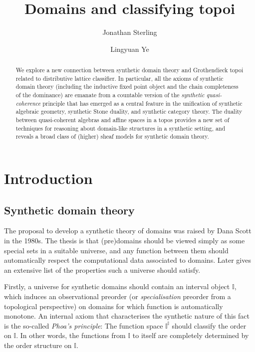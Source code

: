 \documentclass[a4paper,12pt]{amsart}
\title{Domains and classifying topoi}
\author{Jonathan Sterling}
\author{Lingyuan Ye}
\theoremstyle{definition}
\newcommand{\mbb}[1]{\mathbb{#1}}
\newcommand{\I}{\mbb I}
\begin{document}
\begin{abstract}
  We explore a new connection between synthetic domain theory and Grothendieck topoi related to distributive lattice classifier. In particular, all the axioms of synthetic domain theory (including the inductive fixed point object and the chain completeness of the dominance) are emanate from a countable version of the \emph{synthetic quasi-coherence} principle that has emerged as a central feature in the unification of synthetic algebraic geometry, synthetic Stone duality, and synthetic category theory. The duality between quasi-coherent algebras and affine spaces in a topos provides a new set of techniques for reasoning about domain-like structures in a synthetic setting, and reveals a broad class of (higher) sheaf models for synthetic domain theory.
\end{abstract}

\maketitle
\tableofcontents


\section{Introduction}\label{sec:intro}

\subsection{Synthetic domain theory}\label{subsec:sdt}

The proposal to develop a synthetic theory of domains was raised by Dana Scott in the 1980s. The thesis is that (pre)domains should be viewed simply as some special sets in a suitable universe, and any function between them should automatically respect the computational data associated to domains. Later \citet{hyland1990first} gives an extensive list of the properties such a universe should satisfy.

Firstly, a universe for synthetic domains should contain an interval object $\I$, which induces an observational preorder (or \emph{specialisation} preorder from a topological perspective) on domains for which function is automatically monotone. An internal axiom that characterises the synthetic nature of this fact is the so-called \emph{Phoa's principle}: The function space $\I^\I$ should classify the order on $\I$. In other words, the functions from $\I$ to itself are completely determined by the order structure on $\I$. 
\end{document}
